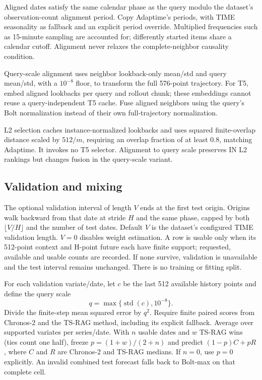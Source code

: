 \documentclass[11pt,a4paper]{article}
\begin{document}
Aligned dates satisfy the same calendar phase as the query modulo the dataset's
observation-count alignment period. Copy Adaptime's periods, with TIME seasonality
as fallback and an explicit period override. Multiplied frequencies such as
15-minute sampling are accounted for; differently started items share a calendar
cutoff. Alignment never relaxes the complete-neighbor causality condition.

Query-scale alignment uses neighbor lookback-only mean/std and query mean/std,
with a $10^{-8}$ floor, to transform the full 576-point trajectory.
For T5, embed aligned lookbacks per query and rollout chunk; these embeddings
cannot reuse a query-independent T5 cache. Fuse aligned neighbors using the
query's Bolt normalization instead of their own full-trajectory normalization.

L2 selection caches instance-normalized lookbacks and uses squared finite-overlap
distance scaled by $512/m$, requiring an overlap fraction of at least 0.8,
matching Adaptime. It invokes no T5 selector. Alignment to query scale preserves
IN L2 rankings but changes fusion in the query-scale variant.

\subsection{Validation and mixing}
The optional validation interval of length $V$ ends at the first test origin.
Origins walk backward from that date at stride $H$ and the same phase, capped
by both $\lfloor V/H\rfloor$ and the number of test dates. Default $V$ is the
dataset's configured TIME validation length. $V=0$ disables weight estimation.
A row is usable only when its 512-point context and H-point future each have
finite support; requested, available and usable counts are recorded. If none
survive, validation is unavailable and the test interval remains unchanged.
There is no training or fitting split.

For each validation variate/date, let $c$ be the last 512 available history
points and define the query scale
\[
 q=\max\{\operatorname{std}(c),10^{-8}\}.
\]
Divide the finite-step mean squared error by $q^2$.
Require finite paired scores from Chronos-2 and the TS-RAG method, including
its explicit fallback. Average over supported variates per series/date.
With $n$ usable dates and $w$ TS-RAG wins (ties count one half), freeze
$p=(1+w)/(2+n)$ and predict $(1-p)C+pR$, where $C$ and $R$ are Chronos-2 and
TS-RAG medians. If $n=0$, use $p=0$ explicitly. An invalid combined test
forecast falls back to Bolt-max on that complete cell.
\end{document}

